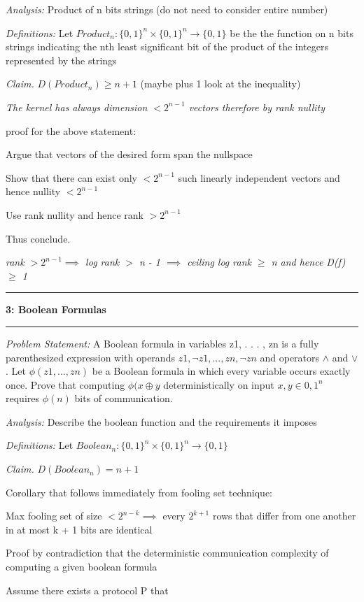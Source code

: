 \documentclass[11pt]{article}
\newcommand\question[2]{\vspace{.25in}\hrule\textbf{#1: #2}\vspace{.5em}\hrule\vspace{.10in}}
\newcommand\analysis{\vspace{.10in}\emph{Analysis: }\newline}
\newcommand\problem{\emph{Problem Statement:}\newline}
\newcommand\definitions{\emph{Definitions:}\newline}
\newcommand\claim{\emph{Claim.}\newline}
\begin{document}
\analysis
Product of n bits strings (do not need to consider entire number)

\definitions
Let $Product_n: {\{0, 1\}}^n \times {\{0, 1\}}^n \to \{0, 1\}$ be the the function on n bits strings indicating the nth least significant bit of the product of the integers represented by the strings

\claim
$D(Product_n) \geq n + 1$ (maybe plus 1 look at the inequality)

\emph{The kernel has always dimension $< 2^{n - 1}$ vectors therefore by rank nullity}

proof for the above statement:

Argue that vectors of the desired form span the nullspace 

Show that there can exist only $< 2 ^ {n - 1}$ such linearly independent vectors and hence nullity $< 2 ^ {n - 1}$

Use rank nullity and hence rank $> 2 ^ {n - 1}$

Thus conclude. 

\emph{rank $>  2^{n - 1} \implies$ log rank $>$ n - 1 $\implies$ ceiling log rank $\geq$ n and hence D(f) $\geq$ 1}

\newpage

\question{3}{Boolean Formulas} 

\problem
A Boolean formula in variables z1, . . . , zn is a fully
parenthesized expression with operands $z1, \lnot z1, . . . , zn, \lnot zn$ and operators $\land$ and $\lor$. Let $\phi (z1, . . . , zn)$ be a Boolean formula in which every variable occurs exactly once. Prove that computing $\phi (x \oplus y$ deterministically on input $x, y \in {0, 1}^n$
requires
$\phi(n)$ bits of communication.

\analysis
Describe the boolean function and the requirements it imposes

\definitions
Let $Boolean_n: {\{0, 1\}}^n \times {\{0, 1\}}^n \to \{0, 1\}$

\claim
$D(Boolean_n) = n + 1$ 

\proof 
Corollary that follows immediately from fooling set technique:

Max fooling set of size $< 2^{n - k} \implies$ every $2^{k + 1}$ rows that differ from one another in at most k + 1 bits are identical 

Proof by contradiction that the deterministic communication complexity of computing a given boolean formula 

Assume there exists a protocol P that 
\newpage
\end{document}
